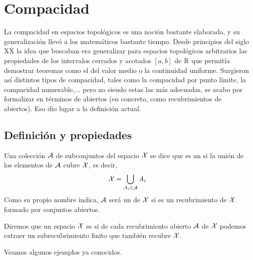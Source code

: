 \chapter{Compacidad}
\label{comp}

La compacidad en espacios topológicos es una noción bastante elaborada, y su generalización llevó a los matemáticos bastante tiempo. Desde principios del siglo XX la idea que buscaban era generalizar para espacios topológicos arbitrarios las propiedades de los intervalos cerrados y acotados $[a,b]$ de $\mathbb{R}$ que permitía demostrar teoremas como el del valor medio o la continuidad uniforme. Surgieron así distintos tipos de compacidad, tales como la compacidad por punto límite, la compacidad numerable,... pero no siendo estas las más adecuadas, se acabo por formalizar en términos de abiertos (en concreto, como recubrimientos de abiertos). Eso dio lugar a la definición actual.

\section{Definición y propiedades}

\begin{defi}
	Una colección $\mathcal{A}$ de subconjuntos del espacio $\mathcal{X}$ se dice que es un  si la unión de los elementos de $\mathcal{A}$ cubre $\mathcal{X}$, es decir,
	\[\mathcal{X} = \bigcup_{A_i \in \mathcal{A}}A_i\]
	Como su propio nombre indica, $\mathcal{A}$ será un  de $\mathcal{X}$ si es un recubrimiento de $\mathcal{X}$ formado por conjuntos abiertos.
\end{defi}

\begin{defi}[Compacto]
	Diremos que un espacio $\mathcal{X}$ es   si de cada recubrimiento abierto $\mathcal{A}$ de $\mathcal{X}$ podemos extraer un subrecubrimiento finito que también recubre $\mathcal{X}$.
\end{defi}

Veamos algunos ejemplos ya conocidos.

